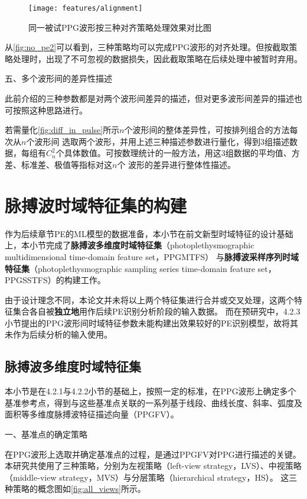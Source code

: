 \begin{figure}[htbp]
  \centering
  \texttt{[image: features/alignment]}
  \caption{\label{fig:no_pe2}同一被试PPG波形按三种对齐策略处理效果对比图}
\end{figure}

从\autoref{fig:no_pe2}可以看到，三种策略均可以完成PPG波形的对齐处理。但按截取策略处理时，出现了不可忽视的数据损失，因此截取策略在后续处理中被暂时弃用。

五、多个波形间的差异性描述

此前介绍的三种参数都是对两个波形间差异的描述，但对更多波形间差异的描述也可按照这种思路进行。

若需量化\autoref{fig:diff_in_pulse}所示$n$个波形间的整体差异性，可按排列组合的方法每次从$n$个波形间
选取两个波形，并用上述三种描述参数进行量化，得到3组描述数据，每组有$C_n^2$个具体数值。可按数理统计的一般方法，用这3组数据的平均值、方差、标准差、极值等指标对这$n$个
波形的差异进行整体性描述。

\section{脉搏波时域特征集的构建}
作为后续章节PE的ML模型的数据准备，本小节在前文新型时域特征的设计基础上，本小节完成了\textbf{脉搏波多维度时域特征集}（photoplethysmographic multidimensional time-domain feature set，PPGMTFS）
与\textbf{脉搏波采样序列时域特征集}（photoplethysmographic sampling series time-domain feature set，PPGSSTFS）的构建工作。

由于设计理念不同，本论文并未将以上两个特征集进行合并或交叉处理，这两个特征集合各自被\textbf{独立地}用作后续PE识别分析阶段的输入数据。
而在预研究中，4.2.3小节提出的PPG波形间时域特征参数未能构建出效果较好的PE识别模型，故将其未作为后续分析的输入使用。

\subsection{脉搏波多维度时域特征集}

本小节是在4.2.1与4.2.2小节的基础上，按照一定的标准，在PPG波形上确定多个基准参考点，得到与这些基准点关联的一系列基于线段、曲线长度、斜率、弧度及面积等多维度脉搏波特征描述向量（PPGFV）。

一、基准点的确定策略

在PPG波形上选取并确定基准点的过程，是通过PPGFV对PPG进行描述的关键。本研究共使用了三种策略，分别为左视策略（left-view strategy，LVS）、中视策略（middle-view strategy，MVS）与分层策略（hierarchical strategy，HS）。
这三种策略的概念图如\autoref{fig:all_views}所示。

